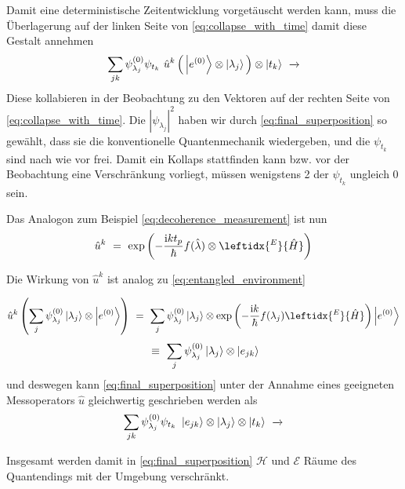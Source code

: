 \documentclass[12pt]{article}
\begin{document}
Damit eine deterministische Zeitentwicklung vorgetäuscht werden kann, muss die Überlagerung auf der linken Seite von \eqref{eq:collapse_with_time} damit diese Gestalt annehmen
\begin{equation}
\label{eq:final_superposition}
\sum_{jk} \psi_{\lambda_j}^{(0)}\psi_{t_k}\ \hat{u}^{k} \left(\,\ket{e^{(0)}} \otimes \ket{\lambda_j} \,\right) \otimes \ket{t_k}
\ \xrightarrow{}
\end{equation}
Diese kollabieren in der Beobachtung zu den Vektoren auf der rechten Seite von  \eqref{eq:collapse_with_time}. Die $|\psi_{\lambda_j}|^2$ haben wir durch \eqref{eq:final_superposition} so gewählt, dass sie die konventionelle Quantenmechanik wiedergeben, und die $\psi_{t_k}$ sind nach wie vor frei. Damit ein Kollaps stattfinden kann bzw. vor der Beobachtung eine Verschränkung vorliegt, müssen wenigstens 2 der $\psi_{t_k}$ ungleich 0 sein. 

Das Analogon zum Beispiel \eqref{eq:decoherence_measurement} ist nun
\begin{equation}
\label{eq:decoherence_measurement_new}
\hat{u}^k\ =\ \mathrm{exp}\left(-\frac{\mathrm{i}k t_p}{\hbar}f(\hat{\lambda})\otimes \leftidx{^E}{\hat{H}}\right)
\end{equation}

Die Wirkung von $\hat{u}^k$ ist analog zu \eqref{eq:entangled_environment}

\begin{equation*}
\hat{u}^k\left(\sum_j \psi^{(0)}_{\lambda_j} \ket{\lambda_j}\otimes\ket{e^{(0)}}\right)
\ =\ \sum_j \psi^{(0)}_{\lambda_j} \ket{\lambda_j} 
\otimes \mathrm{exp}\left(-\frac{\mathrm{i}k}{\hbar}f(\lambda_j)\leftidx{^E}{\hat{H}}\right)
\ket{e^{(0)}} 
\end{equation*}
\begin{equation}
\label{eq:entangled_environment_new}
\ \equiv\ 
\sum_j \psi^{(0)}_{\lambda_j} \ket{\lambda_j} 
\otimes \ket{e_{jk}} 
\end{equation}
und deswegen kann \eqref{eq:final_superposition} unter der Annahme eines geeigneten Messoperators $\hat{u}$ gleichwertig geschrieben werden als
\begin{equation}
\label{eq:final_superposition_2}
\sum_{jk} \psi_{\lambda_j}^{(0)}\psi_{t_k}\ \ket{e_{jk}} \otimes \ket{\lambda_j} \otimes \ket{t_k}
\ \xrightarrow{}
\end{equation}

Insgesamt werden damit in \eqref{eq:final_superposition} $\mathscr{H}$ und $\mathscr{E}$ Räume des Quantendings mit der Umgebung verschränkt.
\end{document}
